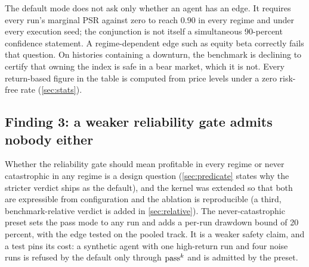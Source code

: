 The default mode does not ask only whether an agent has an edge. It requires every run's marginal PSR against zero to reach $0.90$ in every regime and under every execution seed; the conjunction is not itself a simultaneous 90-percent confidence statement. A regime-dependent edge such as equity beta correctly fails that question. On histories containing a downturn, the benchmark is declining to certify that owning the index is safe in a bear market, which it is not. Every return-based figure in the table is computed from price levels under a zero risk-free rate (\cref{sec:stats}).

\subsection{Finding 3: a weaker reliability gate admits nobody either}\label{sec:ablation}

Whether the reliability gate should mean profitable in every regime or never catastrophic in any regime is a design question (\cref{sec:predicate} states why the stricter verdict ships as the default), and the kernel was extended so that both are expressible from configuration and the ablation is reproducible (a third, benchmark-relative verdict is added in \cref{sec:relative}). The never-catastrophic preset sets the pass mode to any run and adds a per-run drawdown bound of 20 percent, with the edge tested on the pooled track. It is a weaker safety claim, and a test pins its cost: a synthetic agent with one high-return run and four noise runs is refused by the default only through $\text{pass}^{k}$ and is admitted by the preset.

